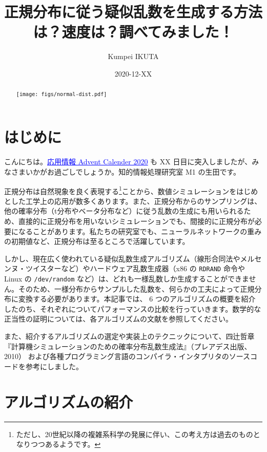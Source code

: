 \documentclass[twocolumn, dvipdfmx]{jsarticle}
\begin{document}
\title{正規分布に従う疑似乱数を生成する方法は？速度は？調べてみました！}
\author{Kumpei IKUTA}
\date{2020-12-XX}

\renewcommand{\abstractname}{}
\begin{abstract}
\centering
\texttt{[image: figs/normal-dist.pdf]}
\end{abstract}

\maketitle

\section*{はじめに}

こんにちは。\href{https://adventar.org/calendars/5671}{\textcolor{blue}{\underline{応用情報 Advent Calender 2020}}} も XX 日目に突入しましたが、みなさまいかがお過ごしでしょうか。知的情報処理研究室 M1 の生田です。

正規分布は自然現象を良く表現する\footnote{ただし、20世紀以降の複雑系科学の発展に伴い、この考え方は過去のものとなりつつあるようです。}ことから、数値シミュレーションをはじめとした工学上の応用が数多くあります。また、正規分布からのサンプリングは、他の確率分布（t分布やベータ分布など）に従う乱数の生成にも用いられるため、直接的に正規分布を用いないシミュレーションでも、間接的に正規分布が必要になることがあります。私たちの研究室でも、ニューラルネットワークの重みの初期値など、正規分布は至るところで活躍しています。

しかし、現在広く使われている疑似乱数生成アルゴリズム（線形合同法やメルセンヌ・ツイスターなど）やハードウェア乱数生成器（x86 の \texttt{RDRAND} 命令や Linux の \texttt{/dev/random} など）は、どれも一様乱数しか生成することができません。そのため、一様分布からサンプルした乱数を、何らかの工夫によって正規分布に変換する必要があります。本記事では、 6 つのアルゴリズムの概要を紹介したのち、それぞれについてパフォーマンスの比較を行っていきます。数学的な正当性の証明については、各アルゴリズムの文献を参照してください。

また、紹介するアルゴリズムの選定や実装上のテクニックについて、四辻哲章『計算機シミュレーションのための確率分布乱数生成法』（プレアデス出版、2010）\cite{yotsuji2010} および各種プログラミング言語のコンパイラ・インタプリタのソースコードを参考にしました。

\section*{アルゴリズムの紹介}
\end{document}
